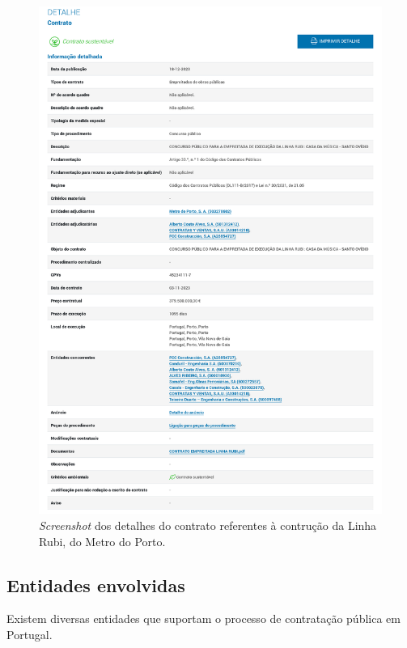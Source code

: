 \clearpage
\begin{figure}[H]
	\centering
	\includegraphics[width=\textwidth]{imagens/metro.png}
	\caption{\textit{Screenshot} dos detalhes do contrato referentes à contrução da Linha Rubi, do Metro do Porto.}
	\label{fig:site4}
\end{figure}

\clearpage
\subsection{Entidades envolvidas}

Existem diversas entidades que suportam o processo de contratação pública em Portugal. 

